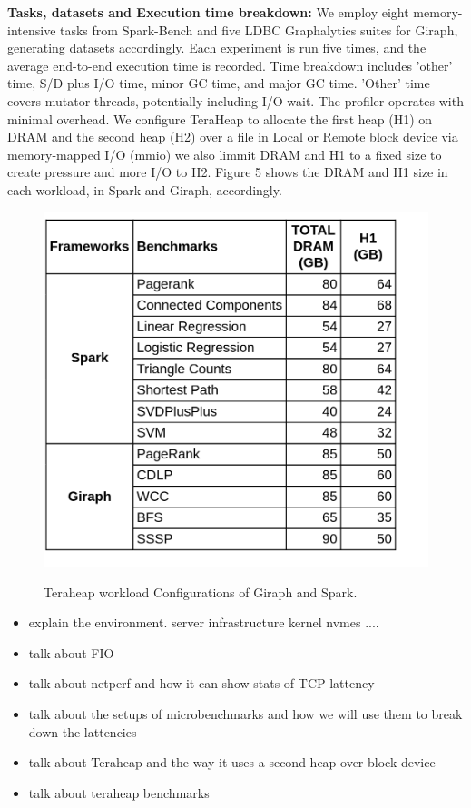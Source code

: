 \textbf{Tasks, datasets and Execution time breakdown:} We employ eight memory-intensive tasks from Spark-Bench and five LDBC Graphalytics suites for Giraph, generating datasets accordingly. Each experiment is run five times, and the average end-to-end execution time is recorded. Time breakdown includes 'other' time, S/D plus I/O time, minor GC time, and major GC time. 'Other' time covers mutator threads, potentially including I/O wait. The profiler operates with minimal overhead. We configure TeraHeap to allocate the first heap (H1) on DRAM and the second heap (H2) over a file in Local or Remote block device via memory-mapped I/O (mmio) we also limmit DRAM and H1 to a fixed size to create pressure and more I/O to H2. Figure 5 shows the DRAM and H1 size in each workload, in Spark and Giraph, accordingly.
\begin{figure}[h]
\includegraphics[scale=0.2]{figures/tera_task_conf.drawio.png}\\
\caption{Teraheap workload Configurations of Giraph and Spark.}
\end{figure}

\begin{itemize}
    \item explain the environment. server infrastructure kernel nvmes ....
    \item talk about FIO 
    \item talk about netperf and how it can show stats of TCP lattency
    \item talk about the setups of microbenchmarks and how we will use them to break down the lattencies
    \item talk about Teraheap and the way it uses a second heap over block device
    \item talk about teraheap benchmarks
\end{itemize}
